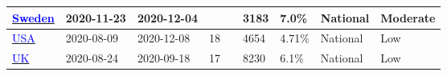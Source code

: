 \begin{table}[!ht]
\begin{center}
\begin{tabular}{p{2cm} | p{1.6cm} | p{1.6cm} | p{0.8cm} | p{0.8cm} | p{1cm} | p{1.3cm} | p{1.2cm} | p{1.2cm}}
\href{https://www.folkhalsomyndigheten.se/contentassets/376f9021a4c84da08de18ac597284f0c/pavisning-antikroppar-genomgangen-covid-19-blodgivare-delrapport-2.pdf}{\textcolor{blue}{Sweden}} & 2020-11-23 & 2020-12-04 &  &  & 3183 & 7.0\% & National & Moderate \\ 
\hline 
\href{https://dx.doi.org/10.1093/cid/ciab626}{\textcolor{blue}{USA}} & 2020-08-09 & 2020-12-08 & 18 &  & 4654 & 4.71\% & National & Low \\ 
\hline 
\href{https://www.gov.uk/government/publications/national-covid-19-surveillance-reports}{\textcolor{blue}{UK}} & 2020-08-24 & 2020-09-18 & 17 &  & 8230 & 6.1\% & National & Low \\ 
\hline 


    \end{tabular}
    \end{center}
\end{table}